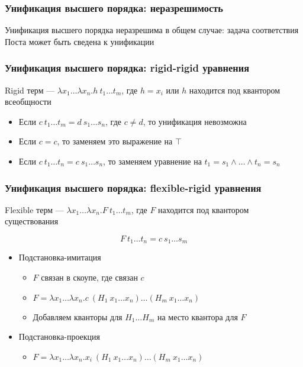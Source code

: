 \documentclass{beamer}
\begin{document}
\begin{frame}[fragile]
  \frametitle{Унификация высшего порядка: неразрешимость}
Унификация высшего порядка неразрешима в общем случае: задача соответствия Поста может быть сведена к унификации
\end{frame}

\begin{frame}[fragile]
  \frametitle{Унификация высшего порядка: rigid-rigid уравнения}
Rigid терм --- $\lambda x_1 \dots \lambda x_n. h \ t_1 \dots t_m$, где $h = x_i$ или $h$ находится под квантором всеобщности

\begin{itemize}
  \item Если $c \ t_1  \dots t_m = d \ s_1 \dots s_n$, где $c \neq d$, то унификация невозможна
  \item Если $c = c$, то заменяем это выражение на $\top$
  \item Если $c \ t_1 \dots t_n = c \ s_1 \dots s_n$, то заменяем уравнение на $t_1 = s_1 \wedge \dots \wedge t_n = s_n$
\end{itemize}
\end{frame}

\begin{frame}[fragile]
  \frametitle{Унификация высшего порядка: flexible-rigid уравнения}
Flexible терм --- $\lambda x_1 \dots \lambda x_n. F \ t_1 \dots t_m$, где $F$ находится под квантором существования

\[ F \ t_1  \dots t_n = c \ s_1 \dots s_m \]

\begin{itemize}
  \item Подстановка-имитация
  \begin{itemize}
    \item $F$ связан в скоупе, где связан $c$
    \item $F = \lambda x_1 \dots \lambda x_n. c \ (H_1 \ x_1 \dots x_n) \dots (H_m \ x_1 \dots x_n)$
    \item Добавляем кванторы для $H_1 \dots H_m$ на место квантора для $F$
  \end{itemize}
  \item Подстановка-проекция
  \begin{itemize}
    \item $F = \lambda x_1 \dots \lambda x_n. x_i \ (H_1 \ x_1 \dots x_n) \dots (H_m \ x_1 \dots x_n)$
  \end{itemize}
\end{itemize}
\end{frame}
\end{document}
